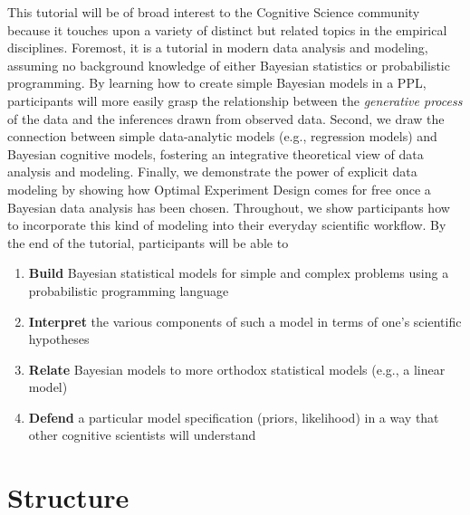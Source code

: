 \documentclass[10pt,letterpaper]{article}
\providecommand{\tightlist}{%
  \setlength{\itemsep}{0pt}\setlength{\parskip}{0pt}}
\begin{document}
This tutorial will be of broad interest to the Cognitive Science community because it touches upon a variety of distinct but related topics in the empirical disciplines. 
Foremost, it is a tutorial in modern data analysis and modeling, assuming no background knowledge of either Bayesian statistics or probabilistic programming. 
By learning how to create simple Bayesian models in a PPL, participants will more easily grasp the relationship between the \emph{generative process} of the data and the inferences drawn from observed data.
Second, we draw the connection between simple data-analytic models (e.g., regression models) and Bayesian cognitive models, fostering an integrative theoretical view of data analysis and modeling.
Finally, we demonstrate the power of explicit data modeling by showing how Optimal Experiment Design comes for free once a Bayesian data analysis has been chosen.
Throughout, we show participants how to incorporate this kind of modeling into their everyday scientific workflow. 
%
By the end of the tutorial, participants will be able to 

\begin{enumerate}
\tightlist
\item \textbf{Build} Bayesian statistical models for simple and complex problems using a probabilistic programming language 
\item \textbf{Interpret} the various components of such a model in terms of one's scientific hypotheses 
\item \textbf{Relate} Bayesian models to more orthodox statistical models (e.g., a linear model) 
\item \textbf{Defend} a particular model specification (priors, likelihood) in a way that other cognitive scientists will understand
\end{enumerate}

\section{Structure}
\end{document}
